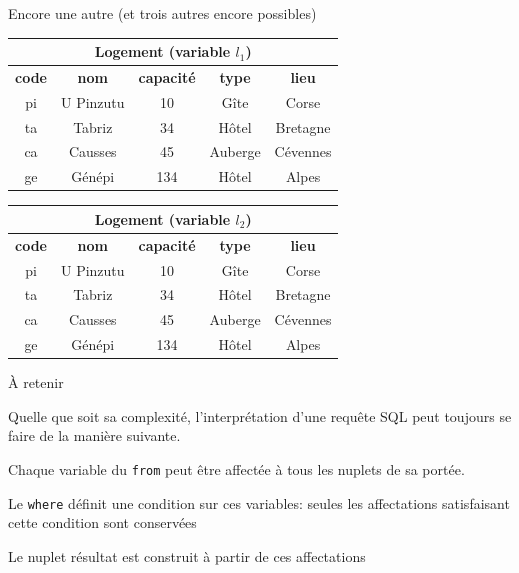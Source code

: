 \begin{frame}[fragile]{Encore une autre (et trois autres encore possibles)}

\begin{tabular}{c|c|c|c|c}
\multicolumn{5}{c}{\textbf{Logement (variable $l_1$)}}\\ \hline
\textbf{code} & \textbf{nom} & \textbf{capacité} & \textbf{type} & \textbf{lieu}\\ \hline 
pi & U Pinzutu & 10 & Gîte & Corse\\ \hline 
ta & Tabriz & 34 & Hôtel & Bretagne\\ \hline 
\rowcolor{asparagus}
ca & Causses & 45 & Auberge & Cévennes\\ \hline 
ge & Génépi & 134 & Hôtel & Alpes\\ \hline 
\end{tabular}

\vfill

\begin{tabular}{c|c|c|c|c}
\multicolumn{5}{c}{\textbf{Logement (variable $l_2$)}}\\ \hline
\textbf{code} & \textbf{nom} & \textbf{capacité} & \textbf{type} & \textbf{lieu}\\ \hline 
pi & U Pinzutu & 10 & Gîte & Corse\\ \hline 
ta & Tabriz & 34 & Hôtel & Bretagne\\ \hline 
\rowcolor{bananamania}
ca & Causses & 45 & Auberge & Cévennes\\ \hline 
ge & Génépi & 134 & Hôtel & Alpes\\ \hline 
\end{tabular}

\end{frame}
\begin{frame}{À retenir}

Quelle que soit sa complexité, l'interprétation d'une requête SQL peut \alert{toujours}
se faire de la manière suivante.

\vfill

\begin{redbullet}
  \item  Chaque variable du \texttt{from} peut être affectée à tous les nuplets
       de sa portée.
  \item Le \texttt{where} définit une condition sur ces variables: seules
     les affectations satisfaisant cette condition sont conservées
    \item Le nuplet résultat est construit à partir de ces affectations
\end{redbullet}

\end{frame}


